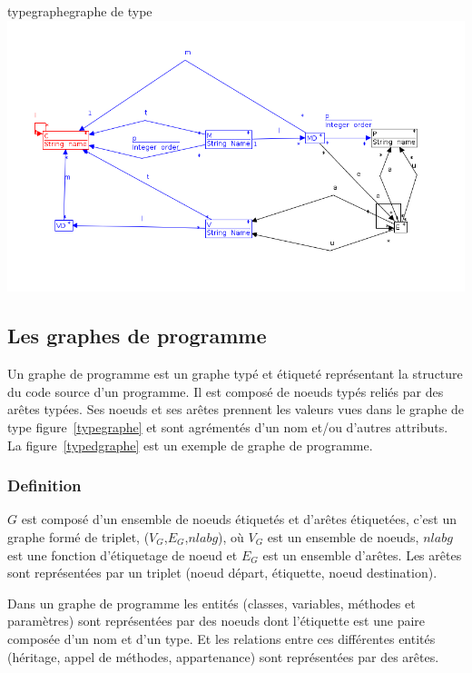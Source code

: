 \documentclass[a4paper, 12pt]{article}
\begin{document}
  \begin{myfig}{typegraphe}{graphe de type}
    \includegraphics[width=\textwidth]{typeGraph.png}
  \end{myfig}

  \subsection{Les graphes de programme}

  Un graphe de programme est un graphe typé et étiqueté représentant la structure du code source d'un programme.
  Il est composé de noeuds typés reliés par des arêtes typées. Ses noeuds et ses arêtes prennent les valeurs vues dans le graphe de type figure~\ref{typegraphe}
  et sont agrémentés d'un nom et/ou d'autres attributs. La figure~\ref{typedgraphe} est un exemple de graphe de programme.

  \subsubsection{Definition}
  \(G \) est composé d'un ensemble de noeuds étiquetés et d'arêtes étiquetées, c'est un graphe formé de triplet, ({$V_G$},{$E_G$},\(nlabg \)), où {$V_G$} est un ensemble de noeuds,
  \(nlabg \) est une fonction d'étiquetage de noeud et {$E_G$} est un ensemble d'arêtes. Les arêtes sont représentées par un triplet (noeud départ, étiquette, noeud destination).

  Dans un graphe de programme les entités (classes, variables, méthodes et paramètres) sont représentées par des noeuds dont l'étiquette est une paire composée d'un nom et d'un type.
  Et les relations entre ces différentes entités (héritage, appel de méthodes, appartenance) sont représentées par des arêtes.
\end{document}
